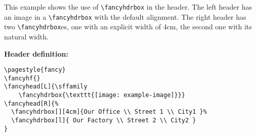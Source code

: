 \documentclass{article}
\begin{document}
This example shows the use of \verb|\fancyhdrbox| in the header. The left header has an image in a \verb|\fancyhdrbox| with the default alignment. The right header has two  \verb|\fancyhdrbox|es, one with an explicit width of 4cm, the second one with its natural width.

\textbf{Header definition:}

\begin{verbatim}
\pagestyle{fancy}
\fancyhf{}
\fancyhead[L]{\sffamily
    \fancyhdrbox{\texttt{[image: example-image]}}}
\fancyhead[R]{%
  \fancyhdrbox[][4cm]{Our Office \\ Street 1 \\ City1 }%
  \fancyhdrbox[l]{ Our Factory \\ Street 2 \\ City2 }
}
\end{verbatim}

\kant[1-2]
\end{document}
